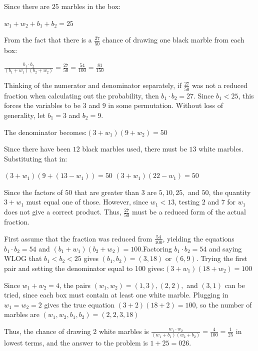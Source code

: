 \begin{enumerate}
 Since there are $25$ marbles in the box:

 $w_1 + w_2 + b_1 + b_2 = 25$

 From the fact that there is a $\frac{27}{50}$ chance of drawing one black marble from each box:

 $\frac{b_1 \cdot b_2}{(b_1 + w_1)(b_2 + w_2)} = \frac{27}{50} = \frac{54}{100} = \frac{81}{150}$

 Thinking of the numerator and denominator separately, if $\frac{27}{50}$ was not a reduced fraction when calculating out the probability, then $b_1 \cdot b_2 = 27$.  Since $b_1 < 25$, this forces the variables to be $3$ and $9$ in some permutation.  Without loss of generality, let $b_1 = 3$ and $b_2 = 9$.

 The denominator becomes:$(3 + w_1)(9 + w_2) = 50$

 Since there have been $12$ black marbles used, there must be $13$ white marbles.  Substituting that in:

 $(3 + w_1)(9 + (13 - w_1)) = 50$
$(3 + w_1)(22 - w_1) = 50$

 Since the factors of $50$ that are greater than $3$ are $5, 10, 25,$ and $50$, the quantity $3 + w_1$ must equal one of those.  However, since $w_1 < 13$, testing $2$ and $7$ for $w_1$ does not give a correct product.  Thus, $\frac{27}{50}$ must be a reduced form of the actual fraction.

 First assume that the fraction was reduced from $\frac{54}{100}$, yielding the equations $b_1\cdot b_2 = 54$ and $(b_1 + w_1)(b_2 + w_2) = 100$.Factoring $b_1 \cdot b_2 = 54$ and saying WLOG that $b_1 <  b_2 < 25$ gives $(b_1, b_2) = (3, 18)$ or $(6, 9)$.  Trying the first pair and setting the denominator equal to 100 gives:$(3 + w_1)(18 + w_2) = 100$

 
Since $w_1 + w_2 = 4$, the pairs $(w_1, w_2) = (1, 3), (2,2),$ and $(3,1)$ can be tried, since each box must contain at least one white marble.  Plugging in $w_1 = w_2 = 2$ gives the true equation $(3 + 2)(18 + 2) =100$, so the number of marbles are $(w_1, w_2, b_1, b_2) = (2, 2, 3, 18)$

 Thus, the chance of drawing 2 white marbles is $\frac{w_1 \cdot w_2 }{(w_1+ b_1)(w_2 + b_2)} = \frac{4}{100} = \frac{1}{25}$ in lowest terms, and the answer to the problem is  $1 + 25 = \boxed{026}.$

 



\end{enumerate}
